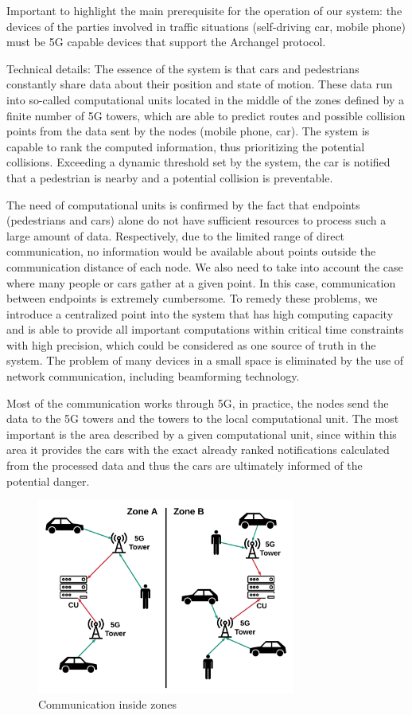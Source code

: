 \documentclass[conference]{IEEEtran}
\begin{document}
Important to highlight the main prerequisite for the operation of our system: the devices of the parties involved in traffic situations (self-driving car, mobile phone) must be 5G capable devices that support the Archangel protocol.

Technical details: The essence of the system is that cars and pedestrians constantly share data about their position and state of motion. These data run into so-called computational units located in the middle of the zones defined by a finite number of 5G towers, which are able to predict routes and possible collision points from the data sent by the nodes (mobile phone, car). The system is capable to rank the computed information, thus prioritizing the potential collisions. Exceeding a dynamic threshold set by the system, the car is notified that a pedestrian is nearby and a potential collision is preventable.

The need of computational units is confirmed by the fact that endpoints (pedestrians and cars) alone do not have sufficient resources to process such a large amount of data. Respectively, due to the limited range of direct communication, no information would be available about points outside the communication distance of each node. We also need to take into account the case where many people or cars gather at a given point. In this case, communication between endpoints is extremely cumbersome. To remedy these problems, we introduce a centralized point into the system that has high computing capacity and is able to provide all important computations within critical time constraints with high precision, which could be considered as one source of truth in the system. The problem of many devices in a small space is eliminated by the use of network communication, including beamforming technology.

Most of the communication works through 5G, in practice, the nodes send the data to the 5G towers and the towers to the local computational unit. The most important is the area described by a given computational unit, since within this area it provides the cars with the exact already ranked notifications calculated from the processed data and thus the cars are ultimately informed of the potential danger.

\begin{figure}[ht]
    \centering
    \includegraphics[width=8.5cm]{./pics/Communication.png}
    \caption{Communication inside zones}
\end{figure}
\end{document}
